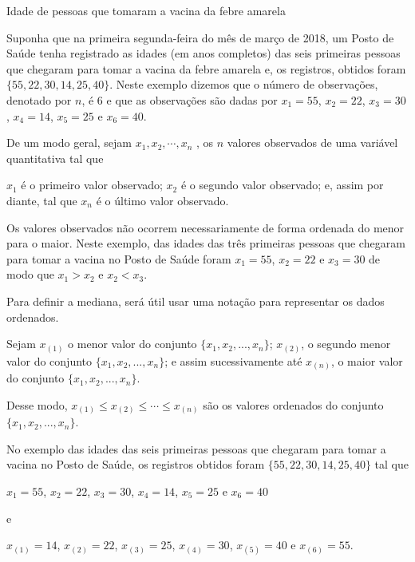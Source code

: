 \begin{example}{Idade de pessoas que tomaram a vacina da febre amarela}

Suponha que na primeira segunda-feira do mês de março de 2018, um Posto de Saúde tenha registrado as idades (em anos completos) das seis primeiras pessoas que chegaram para tomar a vacina da febre amarela e, os registros, obtidos foram \(\{55, 22, 30, 14, 25, 40\}\). Neste exemplo dizemos que o número de observações, denotado por \(n\), é \(6\) e que as observações são dadas por \(x_1=55\), \(x_2=22\), \(x_3=30\), \(x_4=14\), \(x_5=25\) e \(x_6=40\).

De um modo geral, sejam \(x_1,x_2, \cdots, x_n\) , os \(n\) valores observados de uma variável quantitativa tal que

\(x_1\) é o primeiro valor observado; \(x_2\) é o segundo valor observado; e, assim por diante, tal que \(x_n\) é o último valor observado.

Os valores observados não ocorrem necessariamente de forma ordenada do menor para o maior. Neste exemplo, das idades das três primeiras pessoas que chegaram para tomar a vacina no Posto de Saúde foram \(x_1=55\), \(x_2=22\) e \(x_3=30\) de modo que \(x_1>x_2\) e \(x_2<x_3\).

Para definir a mediana, será útil usar uma notação para representar os dados ordenados.

Sejam \(x_{(1)}\) o menor valor do conjunto \(\{ x_1,x_2,...,x_n\}\); \(x_{(2)}\), o segundo menor valor do conjunto \(\{ x_1,x_2,...,x_n\}\); e assim sucessivamente até \(x_{(n)}\), o maior valor do conjunto \(\{ x_1,x_2,...,x_n\}\).

Desse modo,
\(x_{(1)}\leq x_{(2)}\leq \cdots\leq x_{(n)}\) são os valores ordenados do conjunto \(\{ x_1,x_2,...,x_n\}\).

No exemplo das idades das seis primeiras pessoas que chegaram para tomar a vacina no Posto de Saúde, os registros obtidos foram \(\{55, 22, 30, 14, 25, 40\}\) tal que

\(x_1=55\), \(x_2=22\), \(x_3=30\), \(x_4=14\), \(x_5=25\) e \(x_6=40\)

e

\(x_{(1)}=14\), \(x_{(2)}=22\), \(x_{(3)}=25\), \(x_{(4)}=30\), \(x_{(5)}=40\) e \(x_{(6)}=55\).

\end{example}

